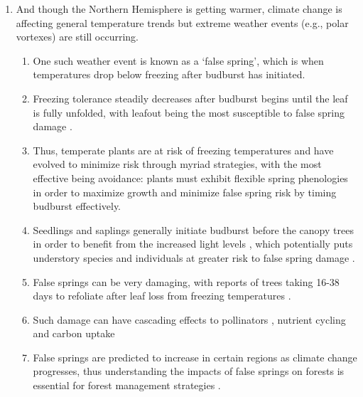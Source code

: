\documentclass{article}\usepackage[]{graphicx}\usepackage[]{color}
\begin{document}
\begin{enumerate}
\item And though the Northern Hemisphere is getting warmer, climate change is affecting general temperature trends but extreme weather events (e.g., polar vortexes) are still occurring. 
  \begin{enumerate}
  \item One such weather event is known as a `false spring', which is when temperatures drop below freezing after budburst has initiated.
  \item Freezing tolerance steadily decreases after budburst begins until the leaf is fully unfolded, with leafout being the most susceptible to false spring damage \citep {Lenz2016}.
  \item Thus, temperate plants are at risk of freezing temperatures and have evolved to minimize risk through myriad strategies, with the most effective being avoidance: plants must exhibit flexible spring phenologies in order to maximize growth and minimize false spring risk by timing budburst effectively.
  \item Seedlings and saplings generally initiate budburst before the canopy trees in order to benefit from the increased light levels \citep {Augspurger2008, Vitasse2013}, which potentially puts understory species and individuals at greater risk to false spring damage \citep{Vitasse2014}.
  \item False springs can be very damaging, with reports of trees taking 16-38 days to refoliate after leaf loss from freezing temperatures \citep{Augspurger2009, Augspurger2013, Gu2008, Menzel2015}. 
  \item Such damage can have cascading effects to pollinators \citep{Boggs2012, Pardee2017}, nutrient cycling and carbon uptake \citep{Hufkens2012, Klosterman2018, Richardson2013}
  \item False springs are predicted to increase in certain regions as climate change progresses, thus understanding the impacts of false springs on forests is essential for forest management strategies \citep{OBrien2012}.
  \end{enumerate}
  

\end{enumerate}
\end{document}
